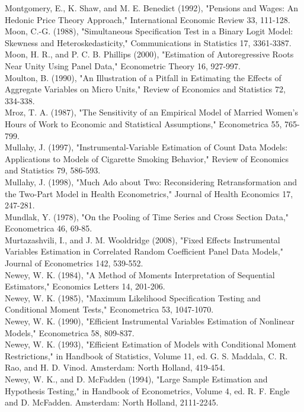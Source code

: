 \documentclass[10pt]{article}
\begin{document}
Montgomery, E., K. Shaw, and M. E. Benedict (1992), "Pensions and Wages: An Hedonic Price Theory Approach," International Economic Review 33, 111-128.\\
Moon, C.-G. (1988), "Simultaneous Specification Test in a Binary Logit Model: Skewness and Heteroskedasticity," Communications in Statistics 17, 3361-3387.\\
Moon, H. R., and P. C. B. Phillips (2000), "Estimation of Autoregressive Roots Near Unity Using Panel Data," Econometric Theory 16, 927-997.\\
Moulton, B. (1990), "An Illustration of a Pitfall in Estimating the Effects of Aggregate Variables on Micro Units," Review of Economics and Statistics 72, 334-338.\\
Mroz, T. A. (1987), "The Sensitivity of an Empirical Model of Married Women's Hours of Work to Economic and Statistical Assumptions," Econometrica 55, 765-799.\\
Mullahy, J. (1997), "Instrumental-Variable Estimation of Count Data Models: Applications to Models of Cigarette Smoking Behavior," Review of Economics and Statistics 79, 586-593.\\
Mullahy, J. (1998), "Much Ado about Two: Reconsidering Retransformation and the Two-Part Model in Health Econometrics," Journal of Health Economics 17, 247-281.\\
Mundlak, Y. (1978), "On the Pooling of Time Series and Cross Section Data," Econometrica 46, 69-85.\\
Murtazashvili, I., and J. M. Wooldridge (2008), "Fixed Effects Instrumental Variables Estimation in Correlated Random Coefficient Panel Data Models," Journal of Econometrics 142, 539-552.\\
Newey, W. K. (1984), "A Method of Moments Interpretation of Sequential Estimators," Economics Letters 14, 201-206.\\
Newey, W. K. (1985), "Maximum Likelihood Specification Testing and Conditional Moment Tests," Econometrica 53, 1047-1070.\\
Newey, W. K. (1990), "Efficient Instrumental Variables Estimation of Nonlinear Models," Econometrica 58, 809-837.\\
Newey, W. K. (1993), "Efficient Estimation of Models with Conditional Moment Restrictions," in Handbook of Statistics, Volume 11, ed. G. S. Maddala, C. R. Rao, and H. D. Vinod. Amsterdam: North Holland, 419-454.\\
Newey, W. K., and D. McFadden (1994), "Large Sample Estimation and Hypothesis Testing," in Handbook of Econometrics, Volume 4, ed. R. F. Engle and D. McFadden. Amsterdam: North Holland, 2111-2245.\\
\end{document}
